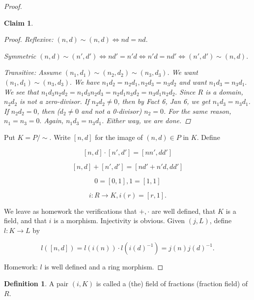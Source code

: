 \documentclass{amsart}
\newtheorem*{claim}{Claim}
\theoremstyle{definition}
\newtheorem{defn}[thm]{Definition}
\theoremstyle{remark}
\begin{document}
\begin{proof}
\begin{claim}
\begin{proof}
Reflexive: $(n,d)\sim(n,d)\iff nd=nd.$

Symmetric $(n,d)\sim(n',d')\iff nd'=n'd\iff n'd=nd'\iff (n',d')\sim (n,d).$

Transitive: Assume $(n_1,d_1)\sim(n_2,d_2)\sim(n_3,d_3)$. We want $(n_1,d_1)\sim(n_3,d_3).$
We have $n_1d_2=n_2d_1,n_2d_3=n_3d_2$ and want $n_1d_3=n_3d_1.$
We see that $n_1d_3 n_2d_2=n_1d_3n_2d_3=n_2d_1n_3d_2=n_3d_1n_2d_2.$
Since $R$ is a domain, $n_2d_2$ is not a zero-divisor. If $n_2d_2\ne 0$, then by Fact 6, Jan 6, we get $n_1d_3=n_3d_1$. If $n_2d_2=0$, then ($d_2\ne 0$ and not a 0-divisor) $n_2=0$. For the same reason, $n_1=n_3=0.$ Again, $n_1d_3=n_3d_1$. Either way, we are done.
\end{proof}
\end{claim}

Put $K=P/\sim.$ Write $[n,d]$ for the image of $(n,d)\in P$ in $K$. Define

$$[n,d]\cdot[n',d']=[nn',dd']$$

$$[n,d]+[n',d']=[nd'+n'd,dd']$$

$$0=[0,1],1=[1,1]$$

$$i:R\rightarrow K, i(r)=[r,1].$$

We leave as homework the verifications that $+,\cdot$ are well defined, that $K$ is a field, and that $i$ is a morphism. Injectivity is obvious. Given $(j,L)$, define $l:K\longrightarrow L$ by

$$l([n,d])=l(i(n))\cdot l(i(d)^{-1})=j(n)j(d)^{-1}.$$

Homework: $l$ is well defined and a ring morphism.

\end{proof}

\begin{defn}

A pair $(i,K)$ is called a (the) field of fractions (fraction field) of $R$.

\end{defn}
\end{document}
